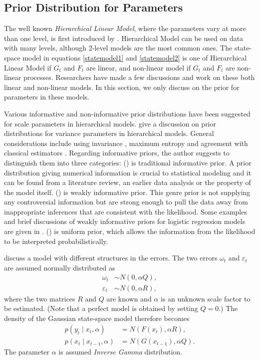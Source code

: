 \subsection{Prior Distribution for Parameters}

The well known \textit{Hierarchical Linear Model}, where the parameters vary at more than one level, is first introduced by \cite{lindley1972bayes, smith1973general}. Hierarchical Model can be used on data with many levels, although 2-level models are the most common ones. The state-space model in equations \eqref{statemodel1} and \eqref{statemodel2} is one of Hierarchical Linear Model if $G_t$ and $F_t$ are linear, and non-linear model if $G_t$ and $F_t$ are non-linear processes. Researchers have made a few discussions and work on these both linear and non-linear models. In this section, we only discuss on the prior for parameters in these models. 

Various informative and non-informative prior distributions have been suggested for scale parameters in hierarchical models. \cite{gelman2006prior} give a discussion on prior distributions for variance parameters in hierarchical models. General considerations include using invariance \citep{jeffries1961theory}, maximum entropy \citep{jaynes1983papers} and agreement with classical estimators \citep{box2011bayesian}. Regarding informative priors, the author suggests to distinguish them into three categories: () is traditional informative prior. A prior distribution giving numerical information is crucial to statistical modeling and it can be found from a literature review, an earlier data analysis or the property of the model itself. () is weakly informative prior. This genre prior is not supplying any controversial information but are strong enough to pull the data away from inappropriate inferences that are consistent with the likelihood. Some examples and brief discussions of weakly informative priors for logistic regression models are given in \citep{gelman2008weakly}. () is uniform prior, which allows the information from the likelihood to be interpreted probabilistically. 

\cite{stroud2007sequential} discuss a model with different structures in the errors. The two errors $\omega_t$ and $\varepsilon_t$ are assumed normally distributed as
\begin{align}
\omega_t &\sim N(0,\alpha Q),\\
\varepsilon_t &\sim N(0,\alpha R),
\end{align}
where the two matrices $R$ and $Q$ are known and $\alpha$ is an unknown scale factor to be estimated. (Note that a perfect model is obtained by setting $Q= 0$.) The density of the Gaussian state-space model therefore becomes 
\begin{align}
p(y_t\mid x_t,\alpha) &= N(F(x_t),\alpha R),\\
p(x_t\mid x_{t-1},\alpha) &= N(G(x_{t-1}),\alpha Q).
\end{align}
The parameter $\alpha$ is assumed \textit{Inverse Gamma} distribution. 

